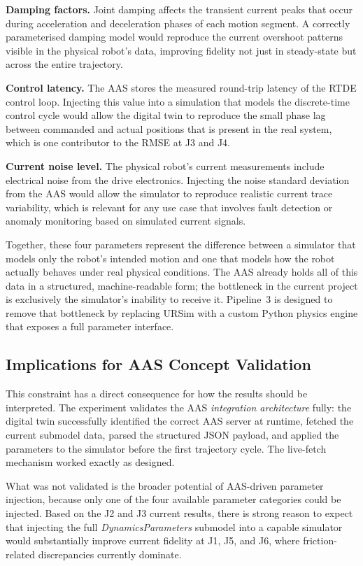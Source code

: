 \textbf{Damping factors.}
Joint damping affects the transient current peaks that occur during acceleration and
deceleration phases of each motion segment.
A correctly parameterised damping model would reproduce the current overshoot patterns visible
in the physical robot's data, improving fidelity not just in steady-state but across the
entire trajectory.

\textbf{Control latency.}
The AAS stores the measured round-trip latency of the RTDE control loop.
Injecting this value into a simulation that models the discrete-time control cycle would allow
the digital twin to reproduce the small phase lag between commanded and actual positions that
is present in the real system, which is one contributor to the RMSE at J3 and J4.

\textbf{Current noise level.}
The physical robot's current measurements include electrical noise from the drive electronics.
Injecting the noise standard deviation from the AAS would allow the simulator to reproduce
realistic current trace variability, which is relevant for any use case that involves
fault detection or anomaly monitoring based on simulated current signals.

Together, these four parameters represent the difference between a simulator that models only
the robot's intended motion and one that models how the robot actually behaves under real
physical conditions.
The AAS already holds all of this data in a structured, machine-readable form; the bottleneck
in the current project is exclusively the simulator's inability to receive it.
Pipeline~3 is designed to remove that bottleneck by replacing URSim with a custom Python
physics engine that exposes a full parameter interface.

\subsection{Implications for AAS Concept Validation}

This constraint has a direct consequence for how the results should be interpreted.
The experiment validates the AAS \emph{integration architecture} fully: the digital twin
successfully identified the correct AAS server at runtime, fetched the current submodel data,
parsed the structured JSON payload, and applied the parameters to the simulator before the
first trajectory cycle.
The live-fetch mechanism worked exactly as designed.

What was not validated is the broader potential of AAS-driven parameter injection, because
only one of the four available parameter categories could be injected.
Based on the J2 and J3 current results, there is strong reason to expect that injecting the
full \textit{DynamicsParameters} submodel into a capable simulator would substantially improve
current fidelity at J1, J5, and J6, where friction-related discrepancies currently dominate.


